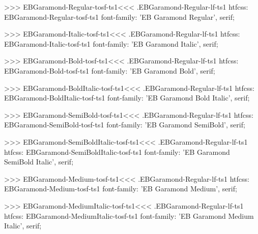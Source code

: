 {{{{{{{>>>
\<EBGaramond-Regular-tosf-ts1\><<<
.EBGaramond-Regular-lf-ts1
htfcss:  EBGaramond-Regular-tosf-ts1  font-family: 'EB Garamond Regular', serif;

>>>
\<EBGaramond-Italic-tosf-ts1\><<<
.EBGaramond-Regular-lf-ts1
htfcss:  EBGaramond-Italic-tosf-ts1  font-family: 'EB Garamond Italic', serif;

>>>
\<EBGaramond-Bold-tosf-ts1\><<<
.EBGaramond-Regular-lf-ts1
htfcss:  EBGaramond-Bold-tosf-ts1  font-family: 'EB Garamond Bold', serif;

>>>
\<EBGaramond-BoldItalic-tosf-ts1\><<<
.EBGaramond-Regular-lf-ts1
htfcss:  EBGaramond-BoldItalic-tosf-ts1  font-family: 'EB Garamond Bold Italic', serif;

>>>
\<EBGaramond-SemiBold-tosf-ts1\><<<
.EBGaramond-Regular-lf-ts1
htfcss:  EBGaramond-SemiBold-tosf-ts1  font-family: 'EB Garamond SemiBold', serif;

>>>
\<EBGaramond-SemiBoldItalic-tosf-ts1\><<<
.EBGaramond-Regular-lf-ts1
htfcss:  EBGaramond-SemiBoldItalic-tosf-ts1  font-family: 'EB Garamond SemiBold Italic', serif;

>>>
\<EBGaramond-Medium-tosf-ts1\><<<
.EBGaramond-Regular-lf-ts1
htfcss:  EBGaramond-Medium-tosf-ts1  font-family: 'EB Garamond Medium', serif;

>>>
\<EBGaramond-MediumItalic-tosf-ts1\><<<
.EBGaramond-Regular-lf-ts1
htfcss:  EBGaramond-MediumItalic-tosf-ts1  font-family: 'EB Garamond Medium Italic', serif;

}}}}}}}
